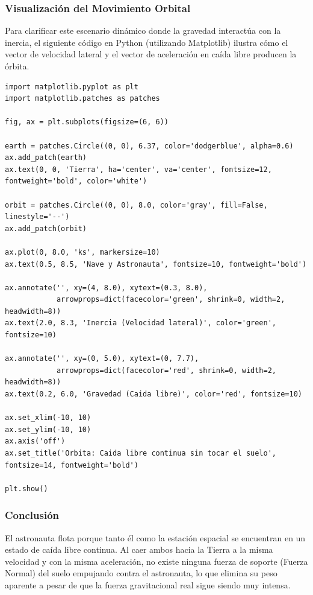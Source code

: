 \documentclass[12pt]{article}
\begin{document}
\subsubsection*{Visualización del Movimiento Orbital}
Para clarificar este escenario dinámico donde la gravedad interactúa con la inercia, el siguiente código en Python (utilizando Matplotlib) ilustra cómo el vector de velocidad lateral y el vector de aceleración en caída libre producen la órbita.

\begin{lstlisting}
import matplotlib.pyplot as plt
import matplotlib.patches as patches

fig, ax = plt.subplots(figsize=(6, 6))

earth = patches.Circle((0, 0), 6.37, color='dodgerblue', alpha=0.6)
ax.add_patch(earth)
ax.text(0, 0, 'Tierra', ha='center', va='center', fontsize=12, fontweight='bold', color='white')

orbit = patches.Circle((0, 0), 8.0, color='gray', fill=False, linestyle='--')
ax.add_patch(orbit)

ax.plot(0, 8.0, 'ks', markersize=10)
ax.text(0.5, 8.5, 'Nave y Astronauta', fontsize=10, fontweight='bold')

ax.annotate('', xy=(4, 8.0), xytext=(0.3, 8.0), 
            arrowprops=dict(facecolor='green', shrink=0, width=2, headwidth=8))
ax.text(2.0, 8.3, 'Inercia (Velocidad lateral)', color='green', fontsize=10)

ax.annotate('', xy=(0, 5.0), xytext=(0, 7.7), 
            arrowprops=dict(facecolor='red', shrink=0, width=2, headwidth=8))
ax.text(0.2, 6.0, 'Gravedad (Caida libre)', color='red', fontsize=10)

ax.set_xlim(-10, 10)
ax.set_ylim(-10, 10)
ax.axis('off')
ax.set_title('Orbita: Caida libre continua sin tocar el suelo', fontsize=14, fontweight='bold')

plt.show()
\end{lstlisting}

\subsubsection*{Conclusión}
El astronauta flota porque tanto él como la estación espacial se encuentran en un estado de caída libre continua. Al caer ambos hacia la Tierra a la misma velocidad y con la misma aceleración, no existe ninguna fuerza de soporte (Fuerza Normal) del suelo empujando contra el astronauta, lo que elimina su peso aparente a pesar de que la fuerza gravitacional real sigue siendo muy intensa.
\end{document}
